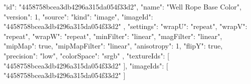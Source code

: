 {
  "id": "4458758bcea3db4296a315da054f33d2",
  "name": "Well Rope Base Color",
  "version": 1,
  "source": {
    "kind": "image",
    "imageId": "4458758bcea3db4296a315da054f33d2"
  },
  "settings": {
    "wrapU": "repeat",
    "wrapV": "repeat",
    "wrapW": "repeat",
    "minFilter": "linear",
    "magFilter": "linear",
    "mipMap": true,
    "mipMapFilter": "linear",
    "anisotropy": 1,
    "flipY": true,
    "precision": "low",
    "colorSpace": "srgb"
  },
  "textureIds": [
    "4458758bcea3db4296a315da054f33d2"
  ],
  "imageIds": [
    "4458758bcea3db4296a315da054f33d2"
  ]
}
